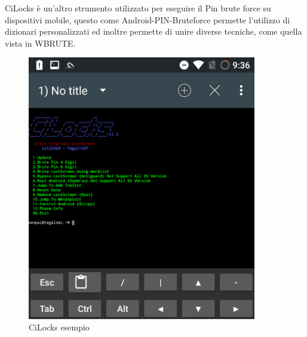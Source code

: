 CiLocks\cite{CiLocks} è un'altro strumento utilizzato per eseguire il Pin brute force su dispositivi mobile, questo come Android-PIN-Bruteforce permette l'utilizzo di dizionari personalizzati ed inoltre permette di unire diverse tecniche, come quella vista in WBRUTE.

\begin{figure}[h!]
	\centering
	\includegraphics[width=100mm]{Immagini/3/cilocks.png}
	\caption{CiLocks esempio}
    \label{fig:CiLocks_esempio}
\end{figure}